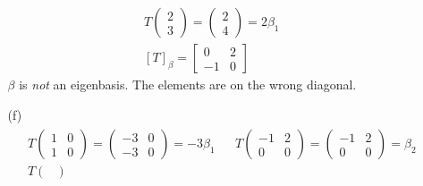 \documentclass[12pt]{article}
\begin{document}
\begin{enumerate}
\begin{enumerate}
\begin{gather*}
                              T\begin{pmatrix}2 \\ 3\end{pmatrix}=\begin{pmatrix}2 \\ 4\end{pmatrix}=2\beta_1 \\
                              [T]_\beta=\begin{bmatrix}
                                    0  & 2 \\
                                    -1 & 0
                              \end{bmatrix}
                        \end{gather*}
                        $\beta$ is \textit{not} an eigenbasis.
                        The elements are on the wrong diagonal.
                  \item[(f)] \begin{gather*}
                              \begin{aligned}
                                     & T\begin{pmatrix}
                                              1 & 0 \\
                                              1 & 0
                                        \end{pmatrix}=\begin{pmatrix}
                                                            -3 & 0 \\
                                                            -3 & 0
                                                      \end{pmatrix}=-3\beta_1 &  &
                                    T\begin{pmatrix}
                                           -1 & 2 \\
                                           0  & 0
                                     \end{pmatrix}=\begin{pmatrix}
                                                         -1 & 2 \\
                                                         0  & 0
                                                   \end{pmatrix}=\beta_2           \\
                                     & T\begin{pmatrix}

\end{pmatrix}
\end{aligned}
\end{gather*}
\end{enumerate}
\end{enumerate}
\end{document}
